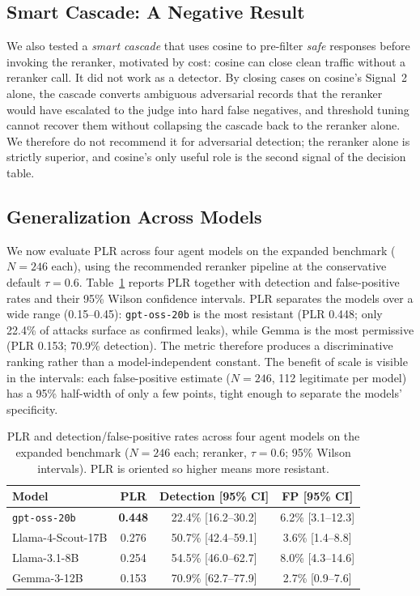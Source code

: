 \documentclass[11pt,a4paper]{article}
\begin{document}
\subsection{Smart Cascade: A Negative Result}
\label{sec:cascade}

We also tested a \emph{smart cascade} that uses cosine to pre-filter \textit{safe} responses
before invoking the reranker, motivated by cost: cosine can close clean traffic without a reranker
call. It did not work as a detector. By closing cases on cosine's Signal~2 alone, the cascade
converts ambiguous adversarial records that the reranker would have escalated to the judge into
hard false negatives, and threshold tuning cannot recover them without collapsing the cascade back
to the reranker alone. We therefore do not recommend it for adversarial detection; the reranker
alone is strictly superior, and cosine's only useful role is the second signal of the decision
table.

\subsection{Generalization Across Models}
\label{sec:generalization}

We now evaluate PLR across four agent models on the expanded benchmark ($N = 246$ each), using the
recommended reranker pipeline at the conservative default $\tau = 0.6$. Table~\ref{tab:multimodel}
reports PLR together with detection and false-positive rates and their 95\% Wilson confidence
intervals. PLR separates the models over a wide range (0.15--0.45): \texttt{gpt-oss-20b} is the
most resistant (PLR 0.448; only 22.4\% of attacks surface as confirmed leaks), while Gemma is the
most permissive (PLR 0.153; 70.9\% detection). The metric therefore produces a discriminative
ranking rather than a model-independent constant. The benefit of scale is visible in the intervals:
each false-positive estimate ($N = 246$, 112 legitimate per model) has a 95\% half-width of only a
few points, tight enough to separate the models' specificity.

\begin{table}[h]
  \centering
  \caption{PLR and detection/false-positive rates across four agent models on the expanded
    benchmark ($N = 246$ each; reranker, $\tau = 0.6$; 95\% Wilson intervals). PLR is oriented so
    higher means more resistant.}
  \label{tab:multimodel}
  \begin{tabular}{lccc}
    \toprule
    Model & PLR & Detection [95\% CI] & FP [95\% CI] \\
    \midrule
    \texttt{gpt-oss-20b}      & \textbf{0.448} & 22.4\% [16.2--30.2] & 6.2\% [3.1--12.3] \\
    Llama-4-Scout-17B         & 0.276 & 50.7\% [42.4--59.1] & 3.6\% [1.4--8.8] \\
    Llama-3.1-8B              & 0.254 & 54.5\% [46.0--62.7] & 8.0\% [4.3--14.6] \\
    Gemma-3-12B               & 0.153 & 70.9\% [62.7--77.9] & 2.7\% [0.9--7.6] \\
    \bottomrule
  \end{tabular}
\end{table}
\end{document}
